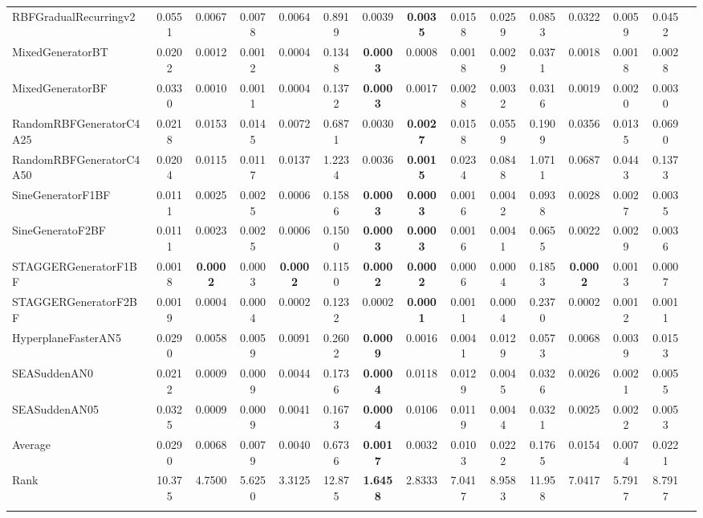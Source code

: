 \documentclass[reqno]{vcuthesis}
\numberwithin{equation}{chapter}
\begin{document}
\begin{table}[b!]
{\begin{tabularx}{1.45\textwidth}{l@{\extracolsep{\fill}}cccccccccccccc}
RBFGradualRecurringv2 &0.0551 &0.0067 &0.0078 &0.0064 &0.8919 &0.0039 &\textbf{0.0035} &0.0158 &0.0259 &0.0853 &0.0322 &0.0059 &0.0452   \\
MixedGeneratorBT &0.0202 &0.0012 &0.0012 &0.0004 &0.1348 &\textbf{0.0003} &0.0008 &0.0018 &0.0029 &0.0371 &0.0018 &0.0018 &0.0028  \\
MixedGeneratorBF &0.0330 &0.0010 &0.0011 &0.0004 &0.1372 &\textbf{0.0003} &0.0017 &0.0028 &0.0032 &0.0316 &0.0019 &0.0020 &0.0030   \\
RandomRBFGeneratorC4A25 &0.0218 &0.0153 &0.0145 &0.0072 &0.6871 &0.0030 &\textbf{0.0027} &0.0158 &0.0559 &0.1909 &0.0356 &0.0135 &0.0690   \\
RandomRBFGeneratorC4A50 &0.0204 &0.0115 &0.0117 &0.0137 &1.2234 &0.0036 &\textbf{0.0015} &0.0234 &0.0848 &1.0711 &0.0687 &0.0443 &0.1373   \\
SineGeneratorF1BF &0.0111 &0.0025 &0.0025 &0.0006 &0.1586 &\textbf{0.0003} &\textbf{0.0003} &0.0016 &0.0042 &0.0938 &0.0028 &0.0027 &0.0035   \\
SineGeneratoF2BF &0.0111 &0.0023 &0.0025 &0.0006 &0.1500 &\textbf{0.0003} &\textbf{0.0003} &0.0016 &0.0041 &0.0655 &0.0022 &0.0029 &0.0036  \\
STAGGERGeneratorF1BF &0.0018 &\textbf{0.0002} &0.0003 &\textbf{0.0002} &0.1150 &\textbf{0.0002} &\textbf{0.0002} &0.0006 &0.0004 &0.1853 &\textbf{0.0002} &0.0013 &0.0007   \\
STAGGERGeneratorF2BF &0.0019 &0.0004 &0.0004 &0.0002 &0.1232 &0.0002 &\textbf{0.0001} &0.0011 &0.0004 &0.2370 &0.0002 &0.0012 &0.0011   \\
HyperplaneFasterAN5 &0.0290 &0.0058 &0.0059 &0.0091 &0.2602 &\textbf{0.0009} &0.0016 &0.0041 &0.0129 &0.0573 &0.0068 &0.0039 &0.0153   \\
SEASuddenAN0 &0.0212 &0.0009 &0.0009 &0.0044 &0.1736 &\textbf{0.0004} &0.0118 &0.0129 &0.0045 &0.0326 &0.0026 &0.0021 &0.0055   \\
SEASuddenAN05 &0.0325 &0.0009 &0.0009 &0.0041 &0.1673 &\textbf{0.0004} &0.0106 &0.0119 &0.0044 &0.0321 &0.0025 &0.0022 &0.0053   \\
\noalign{\smallskip}\hline\noalign{\smallskip}
Average &0.0290 &0.0068 &0.0079 &0.0040 &0.6736 &\textbf{0.0017} &0.0032 &0.0103 &0.0222 &0.1765 &0.0154 &0.0074 &0.0221   \\
Rank &10.375 &4.7500 &5.6250 &3.3125 &12.875 &\textbf{1.6458} &2.8333 &7.0417 &8.9583 &11.958 &7.0417 &5.7917 &8.7917   \\
\noalign{\smallskip}\hline\noalign{\smallskip}
\end{tabularx}}
\begin{minipage}{0.9\textwidth}
\centering
{}
\end{minipage}
\end{table}
\end{document}
